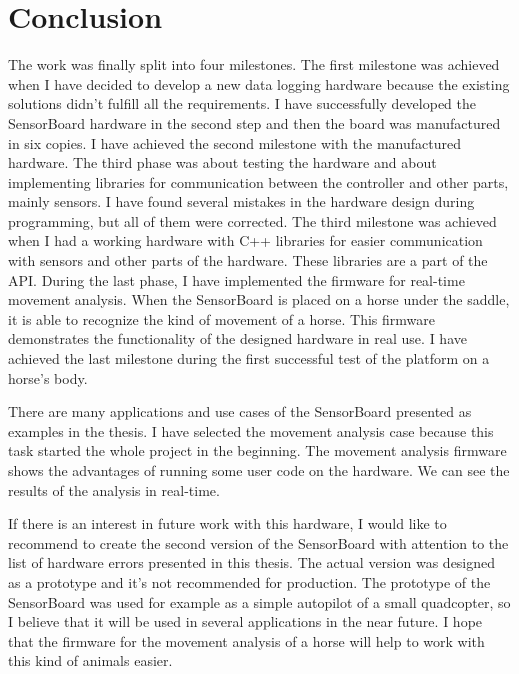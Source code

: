 \chapter{Conclusion}
The work was finally split into four milestones. The first milestone was achieved when I have decided to develop a new data logging hardware because the existing solutions didn't fulfill all the requirements. I have successfully developed the SensorBoard hardware in the second step and then the board was manufactured in six copies. I have achieved the second milestone with the manufactured hardware. The third phase was about testing the hardware and about implementing libraries for communication between the controller and other parts, mainly sensors. I have found several mistakes in the hardware design during programming, but all of them were corrected. The third milestone was achieved when I had a working hardware with C++ libraries for easier communication with sensors and other parts of the hardware. These libraries are a part of the API. During the last phase, I have implemented the firmware for real-time movement analysis. When the SensorBoard is placed on a horse under the saddle, it is able to recognize the kind of movement of a horse. This firmware demonstrates the functionality of the designed hardware in real use. I have achieved the last milestone during the first successful test of the platform on a horse's body.

There are many applications and use cases of the SensorBoard presented as examples in the thesis. I have selected the movement analysis case because this task started the whole project in the beginning. The movement analysis firmware shows the advantages of running some user code on the hardware. We can see the results of the analysis in real-time.

If there is an interest in future work with this hardware, I would like to recommend to create the second version of the SensorBoard with attention to the list of hardware errors presented in this thesis. The actual version was designed as a prototype and it's not recommended for production. The prototype of the SensorBoard was used for example as a simple autopilot of a small quadcopter, so I believe that it will be used in several applications in the near future. I hope that the firmware for the movement analysis of a horse will help to work with this kind of animals easier.
